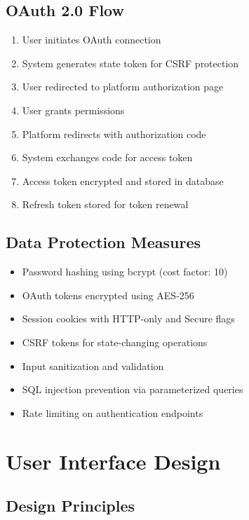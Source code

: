 \subsection{OAuth 2.0 Flow}

\begin{enumerate}
    \item User initiates OAuth connection
    \item System generates state token for CSRF protection
    \item User redirected to platform authorization page
    \item User grants permissions
    \item Platform redirects with authorization code
    \item System exchanges code for access token
    \item Access token encrypted and stored in database
    \item Refresh token stored for token renewal
\end{enumerate}

\subsection{Data Protection Measures}

\begin{itemize}
    \item Password hashing using bcrypt (cost factor: 10)
    \item OAuth tokens encrypted using AES-256
    \item Session cookies with HTTP-only and Secure flags
    \item CSRF tokens for state-changing operations
    \item Input sanitization and validation
    \item SQL injection prevention via parameterized queries
    \item Rate limiting on authentication endpoints
\end{itemize}

\section{User Interface Design}

\subsection{Design Principles}

